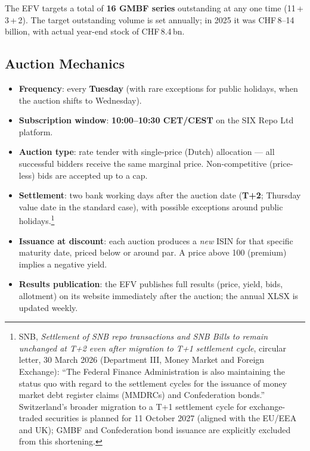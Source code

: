 \documentclass[12pt,a4paper]{article}
\begin{document}
\medskip
\noindent The EFV targets a total of \textbf{16 GMBF series} outstanding at any
one time (11\,+\,3\,+\,2).  The target outstanding volume is set annually; in
2025 it was CHF\,8--14\,billion, with actual year-end stock of CHF\,8.4\,bn.

\subsection{Auction Mechanics}

\begin{itemize}[leftmargin=1.5em, itemsep=2pt]
  \item \textbf{Frequency}: every \textbf{Tuesday} (with rare exceptions for
    public holidays, when the auction shifts to Wednesday).
  \item \textbf{Subscription window}: \textbf{10:00--10:30 CET/CEST} on the
    SIX Repo Ltd platform.
  \item \textbf{Auction type}: rate tender with single-price (Dutch) allocation
    --- all successful bidders receive the same marginal price.  Non-competitive
    (price-less) bids are accepted up to a cap.
  \item \textbf{Settlement}: two bank working days after the auction date
    (\textbf{T+2}; Thursday value date in the standard case), with possible
    exceptions around public holidays.\footnote{SNB, \textit{Settlement of SNB
    repo transactions and SNB Bills to remain unchanged at T+2 even after
    migration to T+1 settlement cycle}, circular letter, 30 March 2026
    (Department III, Money Market and Foreign Exchange): ``The Federal Finance
    Administration is also maintaining the status quo with regard to the
    settlement cycles for the issuance of money market debt register claims
    (MMDRCs) and Confederation bonds.''  Switzerland's broader migration to a
    T+1 settlement cycle for exchange-traded securities is planned for
    11 October 2027 (aligned with the EU/EEA and UK); GMBF and Confederation
    bond issuance are explicitly excluded from this shortening.}
  \item \textbf{Issuance at discount}: each auction produces a \emph{new} ISIN
    for that specific maturity date, priced below or around par.  A price above
    100 (premium) implies a negative yield.
  \item \textbf{Results publication}: the EFV publishes full results
    (price, yield, bids, allotment) on its website immediately after the
    auction; the annual XLSX is updated weekly.
\end{itemize}
\end{document}
